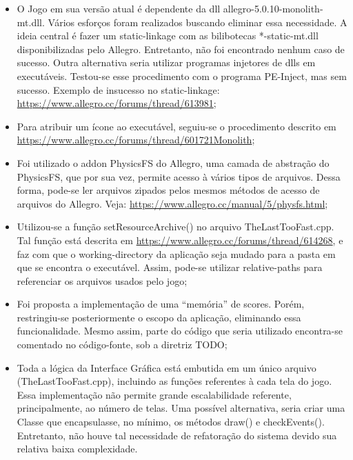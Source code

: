 \documentclass[a4paper]{article}
\newcommand\liststyleWWNumvi{%
\renewcommand\labelitemi{[F0B7?]}
\renewcommand\labelitemii{o}
\renewcommand\labelitemiii{[F0A7?]}
\renewcommand\labelitemiv{[F0B7?]}
}
\begin{document}
\liststyleWWNumvi
\begin{itemize}
\item O Jogo em sua versão atual é dependente da dll
allegro-5.0.10-monolith-mt.dll. Vários esforços foram realizados
buscando eliminar essa necessidade. A ideia central é fazer um
static-linkage com as bilibotecas *-static-mt.dll disponibilizadas pelo
Allegro. Entretanto, não foi encontrado nenhum caso de sucesso. Outra
alternativa seria utilizar programas injetores de dlls em executáveis.
Testou-se esse procedimento com o programa PE-Inject, mas sem sucesso.
Exemplo de insucesso no static-linkage:
\url{https://www.allegro.cc/forums/thread/613981};
\item Para atribuir um ícone ao executável, seguiu-se o procedimento
descrito em \url{https://www.allegro.cc/forums/thread/601721Monolith};
\item Foi utilizado o addon PhysicsFS do Allegro, uma camada de
abstração do PhysicsFS, que por sua vez, permite acesso à vários tipos
de arquivos. Dessa forma, pode-se ler arquivos zipados pelos mesmos
métodos de acesso de arquivos do Allegro. Veja:
\url{https://www.allegro.cc/manual/5/physfs.html};
\item Utilizou-se a função setResourceArchive() no arquivo
TheLastTooFast.cpp. Tal função está descrita em
\url{https://www.allegro.cc/forums/thread/614268}, e faz com que o
working-directory da aplicação seja mudado para a pasta em que se
encontra o executável. Assim, pode-se utilizar relative-paths para
referenciar os arquivos usados pelo jogo;
\item Foi proposta a implementação de uma “memória” de scores. Porém,
restringiu-se posteriormente o escopo da aplicação, eliminando essa
funcionalidade. Mesmo assim, parte do código que seria utilizado
encontra-se comentado no código-fonte, sob a diretriz TODO;
\item Toda a lógica da Interface Gráfica está embutida em um único
arquivo (TheLastTooFast.cpp), incluindo as funções referentes à cada
tela do jogo. Essa implementação não permite grande escalabilidade
referente, principalmente, ao número de telas. Uma possível
alternativa, seria criar uma Classe que encapsulasse, no mínimo, os
métodos draw() e checkEvents(). Entretanto, não houve tal necessidade
de refatoração do sistema devido sua relativa baixa complexidade.
\end{itemize}

\bigskip


\bigskip


\bigskip
\end{document}

